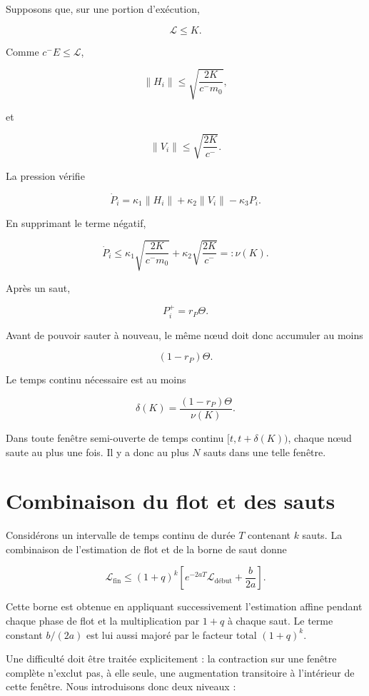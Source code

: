 Supposons que, sur une portion d'exécution,

\[
\mathcal L\leq K.
\]

Comme \(c^{-}E\leq\mathcal L\),

\[
\|H_i\|
\leq
\sqrt{\frac{2K}{c^{-}m_0}},
\]

et

\[
\|V_i\|
\leq
\sqrt{\frac{2K}{c^{-}}}.
\]

La pression vérifie

\[
\dot P_i
=
\kappa_1\|H_i\|
+
\kappa_2\|V_i\|
-
\kappa_3P_i.
\]

En supprimant le terme négatif,

\[
\dot P_i
\leq
\kappa_1
\sqrt{\frac{2K}{c^{-}m_0}}
+
\kappa_2
\sqrt{\frac{2K}{c^{-}}}
=:\nu(K).
\]

Après un saut,

\[
P_i^+=r_P\Theta.
\]

Avant de pouvoir sauter à nouveau, le même nœud doit donc accumuler au
moins

\[
(1-r_P)\Theta.
\]

Le temps continu nécessaire est au moins

\[
\boxed{
\delta(K)
=
\frac{(1-r_P)\Theta}{\nu(K)}
}.
\]

Dans toute fenêtre semi-ouverte de temps continu
\([t,t+\delta(K))\), chaque nœud saute au plus une fois. Il y a donc au
plus \(N\) sauts dans une telle fenêtre.

\section{Combinaison du flot et des sauts}
\label{annexe-energie-combinaison}

Considérons un intervalle de temps continu de durée \(T\) contenant
\(k\) sauts. La combinaison de l'estimation de flot et de la borne de
saut donne

\[
\mathcal L_{\text{fin}}
\leq
(1+q)^k
\left[
e^{-2aT}\mathcal L_{\text{début}}
+
\frac{b}{2a}
\right].
\]

Cette borne est obtenue en appliquant successivement l'estimation
affine pendant chaque phase de flot et la multiplication par \(1+q\)
à chaque saut. Le terme constant \(b/(2a)\) est lui aussi majoré par le
facteur total \((1+q)^k\).

Une difficulté doit être traitée explicitement : la contraction sur
une fenêtre complète n'exclut pas, à elle seule, une augmentation
transitoire à l'intérieur de cette fenêtre. Nous introduisons donc
deux niveaux :

